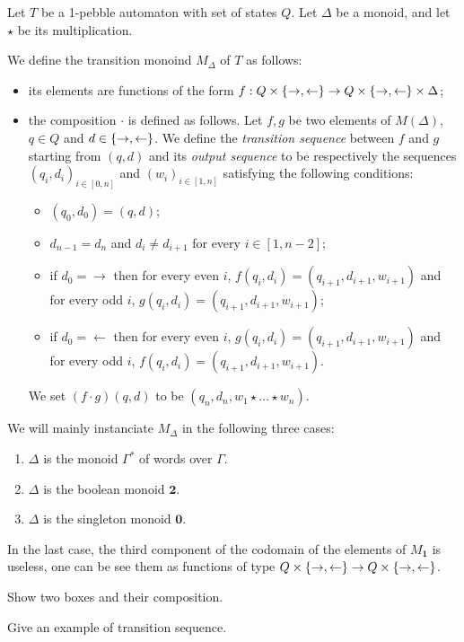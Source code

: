    
\begin{definition}%
Let $T$ be a 1-pebble automaton with set of states $Q$. Let $\Delta$ be a monoid, and let $\star$ be its multiplication.

We define the transition monoind $M_\Delta$ of $T$ as follows:
\begin{itemize}
\item its elements are functions of the form $f:Q\times\{\rightarrow,\leftarrow\}\to Q\times\{\rightarrow,\leftarrow\}\times \Delta$;
\item the composition $\cdot$ is defined as follows. Let $f, g$ be two elements of $M(\Delta)$, $q\in Q$ and $d\in\{\rightarrow, \leftarrow\}$. We define the \emph{transition sequence} between 
$f$ and $g$ starting from $(q,d)$ and its \emph{output sequence} to be respectively the sequences $(q_i,d_i)_{i\in[0,n]}$ and  $(w_i)_{i\in[1,n]}$ satisfying the following conditions: 
\begin{itemize}
\item $(q_0,d_0)=(q,d)$;
\item $d_{n-1}=d_{n}$ and $d_i\neq d_{i+1}$ for every $i\in[1,n-2]$;
\item if $d_0=\rightarrow$ then for every even $i$, $f(q_i,d_i)=(q_{i+1},d_{i+1}, w_{i+1})$ and for every odd $i$, $g(q_i,d_i)=(q_{i+1},d_{i+1}, w_{i+1})$;
\item if $d_0=\leftarrow$ then for every even $i$, $g(q_i,d_i)=(q_{i+1},d_{i+1}, w_{i+1})$ and for every odd $i$, $f(q_i,d_i)=(q_{i+1},d_{i+1}, w_{i+1})$. 
\end{itemize}
We set $(f\cdot g) (q,d)$ to be $(q_n, d_n, w_1\star\dots\star w_n)$.
\end{itemize}
\end{definition}
We will mainly instanciate $M_\Delta$ in the following three cases: 
\begin{enumerate}
\item $\Delta$ is the monoid $\Gamma^*$ of words over $\Gamma$.
\item $\Delta$ is the boolean monoid $\mathbf 2$.
\item $\Delta$ is the singleton monoid $\mathbf 0$.
\end{enumerate}
In the last case, the third component of the codomain of the elements of $M_{\mathbf 1}$ is useless, one can be see them as functions of type $Q\times\{\rightarrow,\leftarrow\}\to Q\times\{\rightarrow,\leftarrow\}$.

\begin{example}
\begin{center}
Show two boxes and their composition.

Give an example of transition sequence.
\end{center}
\end{example}


